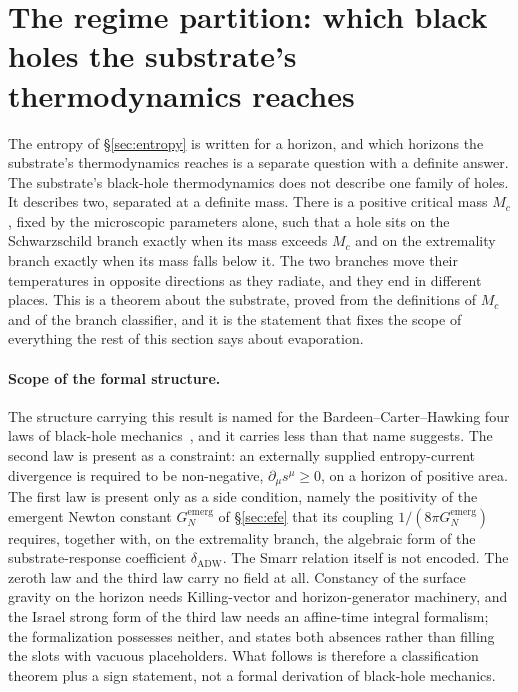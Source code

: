 \documentclass[aps,prd,nofootinbib,superscriptaddress,12pt]{revtex4-2}
\begin{document}
\section{The regime partition: which black holes the substrate's thermodynamics reaches}
\label{sec:regime}

The entropy of \S\ref{sec:entropy} is written for a horizon, and which horizons
the substrate's thermodynamics reaches is a separate question with a definite
answer. The substrate's black-hole thermodynamics does not describe one family
of holes. It describes two, separated at a definite mass. There is a positive
critical mass $M_c$, fixed by the microscopic parameters alone, such that a
hole sits on the Schwarzschild branch exactly when its mass exceeds $M_c$ and
on the extremality branch exactly when its mass falls below it. The two
branches move their temperatures in opposite directions as they radiate, and
they end in different places. This is a theorem about the substrate, proved
from the definitions of $M_c$ and of the branch classifier, and it is the
statement that fixes the scope of everything the rest of this section says
about evaporation.

\paragraph{Scope of the formal structure.}
The structure carrying this result is named for the Bardeen--Carter--Hawking
four laws of black-hole mechanics~\cite{BardeenCarterHawking1973}, and it
carries less than that name suggests. The second law is present as a
constraint: an externally supplied entropy-current divergence is required to
be non-negative, $\partial_\mu s^\mu \ge 0$, on a horizon of positive area.
The first law is present only as a side condition, namely the positivity of
the emergent Newton constant $G_N^{\mathrm{emerg}}$ of \S\ref{sec:efe} that its coupling
$1/(8\pi G_N^{\mathrm{emerg}})$ requires, together with, on the extremality
branch, the algebraic form of the substrate-response coefficient
$\delta_{\mathrm{ADW}}$. The Smarr relation itself is not encoded. The zeroth
law and the third law carry no field at all. Constancy of the surface gravity
on the horizon needs Killing-vector and horizon-generator machinery, and the
Israel strong form of the third law needs an affine-time integral formalism;
the formalization possesses neither, and states both absences rather than
filling the slots with vacuous placeholders. What follows is therefore a
classification theorem plus a sign statement, not a formal derivation of
black-hole mechanics.
\end{document}
